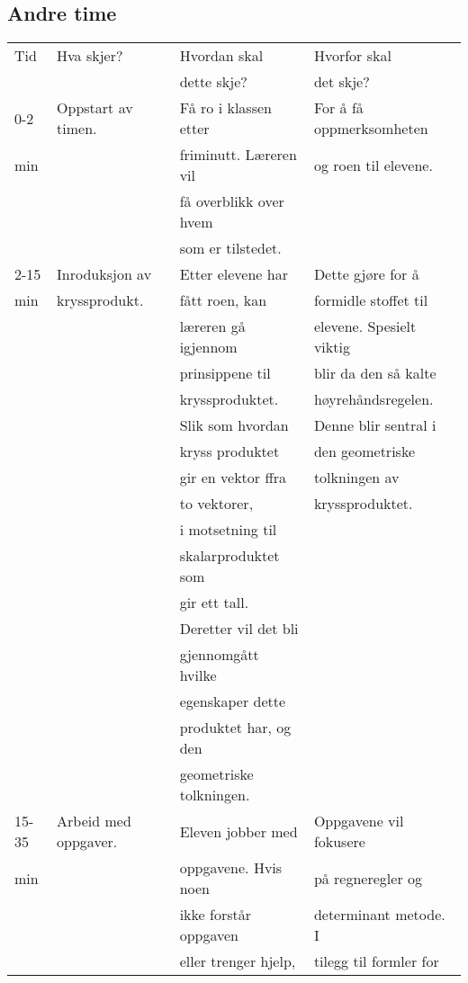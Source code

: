 \documentclass[11pt]{article}
\begin{document}
\subsection*{Andre time}
\label{sec-2-2}
\begin{center}
\begin{tabular}{l|l|l|l}
Tid & Hva skjer? & Hvordan skal & Hvorfor skal\\
 &  & dette skje? & det skje?\\
\hline
0-2 & Oppstart av timen. & Få ro i klassen etter & For å få oppmerksomheten\\
min &  & friminutt. Læreren vil & og roen til elevene.\\
 &  & få overblikk over hvem & \\
 &  & som er tilstedet. & \\
\hline
2-15 & Inroduksjon av & Etter elevene har & Dette gjøre for å\\
min & kryssprodukt. & fått roen, kan & formidle stoffet til\\
 &  & læreren gå igjennom & elevene. Spesielt viktig\\
 &  & prinsippene til & blir da den så kalte\\
 &  & kryssproduktet. & høyrehåndsregelen.\\
 &  & Slik som hvordan & Denne blir sentral i\\
 &  & kryss produktet & den geometriske\\
 &  & gir en vektor ffra & tolkningen av\\
 &  & to vektorer, & kryssproduktet.\\
 &  & i motsetning til & \\
 &  & skalarproduktet som & \\
 &  & gir ett tall. & \\
 &  & Deretter vil det bli & \\
 &  & gjennomgått hvilke & \\
 &  & egenskaper dette & \\
 &  & produktet har, og den & \\
 &  & geometriske tolkningen. & \\
\hline
15-35 & Arbeid med oppgaver. & Eleven jobber med & Oppgavene vil fokusere\\
min &  & oppgavene. Hvis noen & på regneregler og\\
 &  & ikke forstår oppgaven & determinant metode. I\\
 &  & eller trenger hjelp, & tilegg til formler for\\

\end{tabular}
\end{center}
\end{document}
